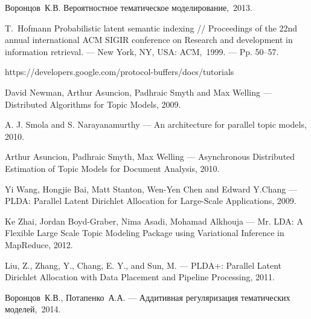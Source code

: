 \documentclass[12pt]{article}
\begin{document}
\newpage
{}
\begin{thebibliography}{00}

Воронцов~К.В. Вероятностное тематическое моделирование,~2013.

T.~Hofmann Probabilistic latent semantic indexing // Proceedings of the 22nd annual international
ACM SIGIR conference on Research and development in information retrieval. — New York, NY,
USA: ACM,~1999. — Pp. 50–57.

https://developers.google.com/protocol-buffers/docs/tutorials

David Newman, Arthur Asuncion, Padhraic Smyth and Max Welling --- Distributed Algorithms for Topic Models, 2009.

A. J. Smola and S. Narayanamurthy --- An architecture for parallel topic models, 2010.

Arthur Asuncion, Padhraic Smyth, Max Welling --- Asynchronous Distributed Estimation of Topic Models for Document Analysis, 2010.

Yi Wang, Hongjie Bai, Matt Stanton, Wen-Yen Chen and Edward Y.Chang --- PLDA: Parallel Latent Dirichlet Allocation for Large-Scale Applications, 2009.

Ke Zhai, Jordan Boyd-Graber, Nima Asadi, Mohamad Alkhouja --- Mr. LDA: A Flexible Large Scale Topic Modeling Package using Variational Inference in MapReduce, 2012.

Liu, Z., Zhang, Y., Chang, E. Y., and Sun, M. --- PLDA+: Parallel Latent Dirichlet Allocation with Data Placement and Pipeline Processing, 2011.

Воронцов~К.В., Потапенко~А.А. --- Аддитивная регуляризация тематических моделей,~2014.

\end{thebibliography}
\end{document}
